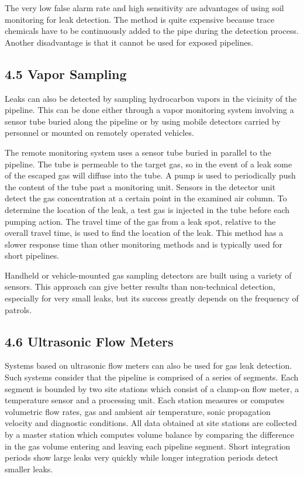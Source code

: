 The very low false alarm rate and high sensitivity are advantages of using soil monitoring for leak detection. The method is quite expensive because trace chemicals have to be continuously added to the pipe during the detection process. Another disadvantage is that it cannot be used for exposed pipelines.

\subsection*{4.5 Vapor Sampling}

Leaks can also be detected by sampling hydrocarbon vapors in the vicinity of the pipeline. This can be done either through a vapor monitoring system involving a sensor tube buried along the pipeline or by using mobile detectors carried by personnel or mounted on remotely operated vehicles.

The remote monitoring system uses a sensor tube buried in parallel to the pipeline. The tube is permeable to the target gas, so in the event of a leak some of the escaped gas will diffuse into the tube. A pump is used to periodically push the content of the tube past a monitoring unit. Sensors in the detector unit detect the gas concentration at a certain point in the examined air column. To determine the location of the leak, a test gas is injected in the tube before each pumping action. The travel time of the gas from a leak spot, relative to the overall travel time, is used to find the location of the leak. This method has a slower response time than other monitoring methods and is typically used for short pipelines.

Handheld or vehicle-mounted gas sampling detectors are built using a variety of sensors. This approach can give better results than non-technical detection, especially for very small leaks, but its success greatly depends on the frequency of patrols.

\subsection*{4.6 Ultrasonic Flow Meters}

Systems based on ultrasonic flow meters can also be used for gas leak detection. Such systems consider that the pipeline is comprised of a series of segments. Each segment is bounded by two site stations which consist of a clamp-on flow meter, a temperature sensor and a processing unit. Each station measures or computes volumetric flow rates, gas and ambient air temperature, sonic propagation velocity and diagnostic conditions. All data obtained at site stations are collected by a master station which computes volume balance by comparing the difference in the gas volume entering and leaving each pipeline segment. Short integration periods show large leaks very quickly while longer integration periods detect smaller leaks.

